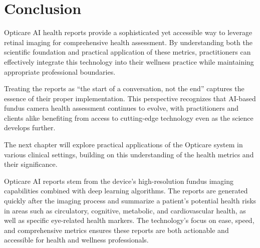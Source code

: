 \documentclass[
  Letterpaper,
]{scrbook}
\begin{document}
\section{Conclusion}\label{conclusion}

Opticare AI health reports provide a sophisticated yet accessible way to
leverage retinal imaging for comprehensive health assessment. By
understanding both the scientific foundation and practical application
of these metrics, practitioners can effectively integrate this
technology into their wellness practice while maintaining appropriate
professional boundaries.

Treating the reports as ``the start of a conversation, not the end''
captures the essence of their proper implementation. This perspective
recognizes that AI-based fundus camera health assessment continues to
evolve, with practitioners and clients alike benefiting from access to
cutting-edge technology even as the science develops further.

The next chapter will explore practical applications of the Opticare
system in various clinical settings, building on this understanding of
the health metrics and their significance.

Opticare AI reports stem from the device's high-resolution fundus
imaging capabilities combined with deep learning algorithms. The reports
are generated quickly after the imaging process and summarize a
patient's potential health risks in areas such as circulatory,
cognitive, metabolic, and cardiovascular health, as well as specific
eye-related health markers. The technology's focus on ease, speed, and
comprehensive metrics ensures these reports are both actionable and
accessible for health and wellness professionals.
\end{document}
